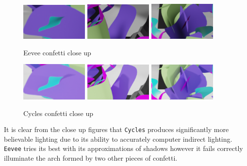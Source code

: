 \documentclass[11pt]{article}
\begin{document}
\begin{figure}[htbp]
\begin{center}
\includegraphics[width=0.3\textwidth]{Images/confetti-eevee-1.png}
\includegraphics[width=0.3\textwidth]{Images/confetti-eevee-2.png}
\includegraphics[width=0.3\textwidth]{Images/confetti-eevee-3.png}
\end{center}
\caption{\label{confetti-eevee-close}Eevee confetti close up}
\end{figure}
\begin{figure}[htbp]
\begin{center}
\includegraphics[width=0.3\textwidth]{Images/confetti-cycles-1.png}
\includegraphics[width=0.3\textwidth]{Images/confetti-cycles-2.png}
\includegraphics[width=0.3\textwidth]{Images/confetti-cycles-3.png}
\end{center}
\caption{\label{confetti-cycles-close}Cycles confetti close up}
\end{figure}
\newpage
It is clear from the close up figures that \texttt{Cycles} produces significantly more
believable lighting due to its ability to accurately computer indirect lighting.
\texttt{Eevee} tries its best with its approximations of shadows however it fails
correctly illuminate the arch formed by two other pieces of confetti.\\
\end{document}
